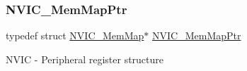 \subsubsection{\texorpdfstring{N\+V\+I\+C\+\_\+\+Mem\+Map\+Ptr}{NVIC\_MemMapPtr}}
{\footnotesize\ttfamily typedef struct \hyperlink{struct_n_v_i_c___mem_map}{N\+V\+I\+C\+\_\+\+Mem\+Map}$\ast$ \hyperlink{group___n_v_i_c___peripheral_ga685d87c766bb24fb3330aa8cc48fa0e7}{N\+V\+I\+C\+\_\+\+Mem\+Map\+Ptr}}

N\+V\+IC -\/ Peripheral register structure 